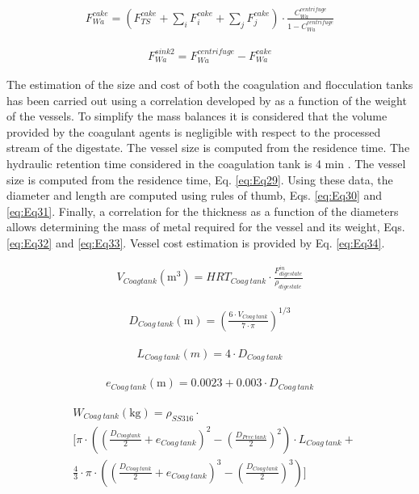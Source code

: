 \begin{refsection}[referencesCh2]
\begin{align}
	{F}_{Wa}^{cake} = \left( {F}_{TS}^{cake} + \sum\limits_i {F_i^{cake} + \sum\limits_j {F}_j^{cake}}  \right) \cdot \frac{{C_{Wa}^{centrifuge}}}{{1 - C_{Wa}^{centrifuge}}} \label{eq:Eq27}
\end{align}

\begin{align}
	{F}_{Wa}^{sink2} = F_{Wa}^{centrifuge} - F_{Wa}^{cake} \label{eq:Eq28}
\end{align}

The estimation of the size and cost of both the coagulation and flocculation tanks has been carried out using a correlation developed by \citet{almena2016technoeconomic} as a function of the weight of the vessels. To simplify the mass balances it is considered that the volume provided by the coagulant agents is negligible with respect to the processed stream of the digestate. The vessel size is computed from the residence time. The hydraulic retention time considered in the coagulation tank is 4 min \citep{zhou2008enhanced}. The vessel size is computed from the residence time, Eq. \ref{eq:Eq29}. Using these data, the diameter and length are computed using rules of thumb, Eqs. \ref{eq:Eq30} and \ref{eq:Eq31}. Finally, a correlation for the thickness as a function of the diameters allows determining the mass of metal required for the vessel and its weight, Eqs. \ref{eq:Eq32} and \ref{eq:Eq33}. Vessel cost estimation is provided by Eq. \ref{eq:Eq34}.

\begin{align}
	{V}_{Coag tank}\left( \text{m}^{3} \right) = HR{T_{Coag \ tank}} \cdot \frac{F_{digestate}^{in}}{\rho_{digestate}} \label{eq:Eq29}
\end{align}

\begin{align}
	{D_{Coag \ tank}} \left( \text{m} \right) = \left( \frac{6 \cdot{V}_{Coag \ tank}}{7 \cdot \pi} \right)^{1/3} \label{eq:Eq30}
\end{align}

\begin{align}
	{L_{{{Coag \ tank}}}}\left( m \right) = 4\cdot{D_{Coag \ tank}} \label{eq:Eq31}
\end{align}

\begin{align}
	{e_{Coag \ tank}}\left( \text{m} \right) = 0.0023 + 0.003\cdot{D_{{{Coag \ tank}}}} \label{eq:Eq32}
\end{align}

\begin{align}
	& {W_{Coag \ tank}}\left( \text{kg} \right) = {\rho_{SS316}}\cdot \label{eq:Eq33} \\
	& \Bigg[ \pi \cdot \left( {{{\left( \frac{{{D_{Coag tank}}}}{2} + {e_{Coag \ tank}} \right)}^2} - {{\left( \frac{{{D_{Prec \ tank}}}}{2} \right)}^2}} \right)\cdot{L_{Coag \ tank}} + \nonumber \\ 
	& \frac{4}{3} \cdot \pi \cdot \left( \left( \frac{D_{Coag \ tank}}{2} + {e_{Coag \ tank}} \right)^3 - \left( \frac{D_{Coag \ tank}}{2} \right)^3 \right) \Bigg] \nonumber
\end{align}


\end{refsection}
